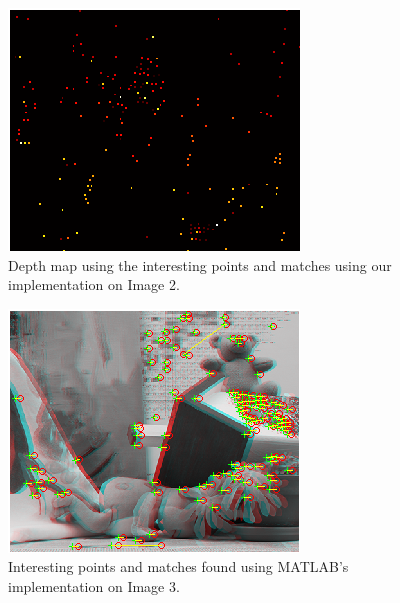 \begin{figure}[H]\centering
	\includegraphics[width=0.8\linewidth]{Images/02_our_depth.png}
	\caption{Depth map using the interesting points and matches using our implementation on Image 2.}
	\label{fig:grid-example}
\end{figure}

\begin{figure}[H]\centering
	\includegraphics[width=0.8\linewidth]{Images/03_matlab_match.png}
	\caption{Interesting points and matches found using MATLAB's implementation on Image 3.}
	\label{fig:grid-example}
\end{figure}

